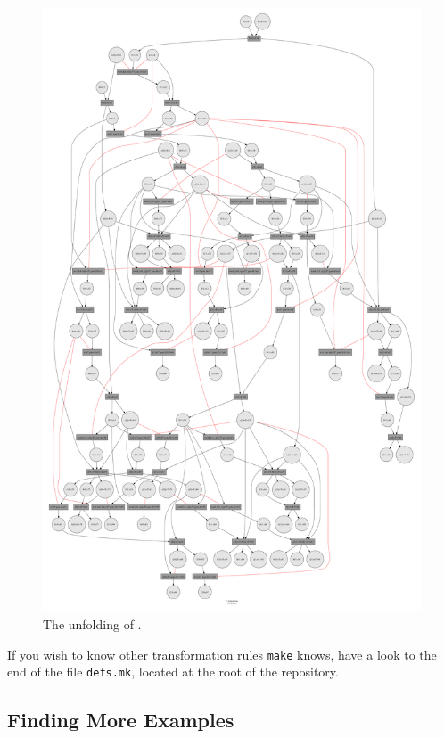 \documentclass[a4paper]{refart}
\begin{document}
\begin{figure}[tb]
\centering
\includegraphics[scale=0.11]{fig/dij02-unf.pdf}
\caption{The unfolding of 
.}
\label{f:dij02unf}
\end{figure}

If you wish to know other transformation rules \verb!make! knows, have a
look to the end of the file \verb!defs.mk!, located at the root of the
repository.

\subsection{Finding More Examples}%
\label{s:finding}
\end{document}
